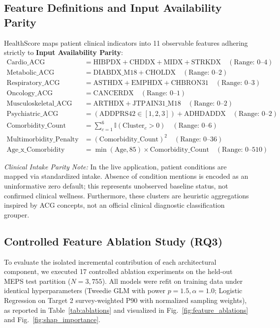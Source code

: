 \documentclass[runningheads]{llncs}
\begin{document}
\subsection{Feature Definitions and Input Availability Parity}
HealthScore maps patient clinical indicators into 11 observable features adhering strictly to \textbf{Input Availability Parity}:
\begin{align}
\text{Cardio\_ACG} &= \text{HIBPDX} + \text{CHDDX} + \text{MIDX} + \text{STRKDX} \quad (\text{Range: } 0\text{--}4) \\
\text{Metabolic\_ACG} &= \text{DIABDX\_M18} + \text{CHOLDX} \quad (\text{Range: } 0\text{--}2) \\
\text{Respiratory\_ACG} &= \text{ASTHDX} + \text{EMPHDX} + \text{CHBRON31} \quad (\text{Range: } 0\text{--}3) \\
\text{Oncology\_ACG} &= \text{CANCERDX} \quad (\text{Range: } 0\text{--}1) \\
\text{Musculoskeletal\_ACG} &= \text{ARTHDX} + \text{JTPAIN31\_M18} \quad (\text{Range: } 0\text{--}2) \\
\text{Psychiatric\_ACG} &= (\text{ADDPRS42} \in [1,2,3]) + \text{ADHDADDX} \quad (\text{Range: } 0\text{--}2) \\
\text{Comorbidity\_Count} &= \sum_{c=1}^6 \mathbb{I}(\text{Cluster}_c > 0) \quad (\text{Range: } 0\text{--}6) \\
\text{Multimorbidity\_Penalty} &= (\text{Comorbidity\_Count})^2 \quad (\text{Range: } 0\text{--}36) \\
\text{Age\_x\_Comorbidity} &= \min(\text{Age}, 85) \times \text{Comorbidity\_Count} \quad (\text{Range: } 0\text{--}510)
\end{align}

\noindent\textit{Clinical Intake Parity Note:} In the live application, patient conditions are mapped via standardized intake. Absence of condition mentions is encoded as an uninformative zero default; this represents unobserved baseline status, not confirmed clinical wellness. Furthermore, these clusters are heuristic aggregations inspired by ACG concepts, not an official clinical diagnostic classification grouper.

\subsection{Controlled Feature Ablation Study (RQ3)}
To evaluate the isolated incremental contribution of each architectural component, we executed 17 controlled ablation experiments on the held-out MEPS test partition ($N=3,755$). All models were refit on training data under identical hyperparameters (Tweedie GLM with power $p=1.5, \alpha=1.0$; Logistic Regression on Target 2 survey-weighted P90 with normalized sampling weights), as reported in Table~\ref{tab:ablations} and visualized in Fig.~\ref{fig:feature_ablations} and Fig.~\ref{fig:shap_importance}.
\end{document}
